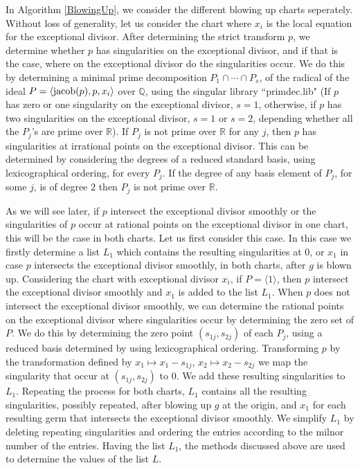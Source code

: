 \documentclass{amsproc}
\begin{document}
In Algorithm \ref{BlowingUp}, we consider the different blowing up charts seperately. Without loss of generality, let us consider the chart where $x_i$ is the local equation for the exceptional divisor. After determining the strict transform $p$, we determine whether $p$ has singularities on the exceptional divisor, and if that is the case, where on the exceptional divisor do the singularities occur. We do this by determining a minimal prime decomposition $P_1\cap\cdots\cap P_s$, of the radical of the ideal $P=\langle \textnormal{jacob}(p),p,x_i\rangle$ over $\mathbb Q$, using the singular library ``primdec.lib" \cite{primdec.lib} (If $p$ has zero or one singularity on the exceptional divisor, $s=1$, otherwise, if $p$ has two singularities on the exceptional divisor, $s=1$ or $s=2$, depending whether all the $P_j$'s are prime over $\mathbb R$).  If $P_j$ is not prime over $\mathbb R$ for any $j$, then $p$ has singularities at irrational points on the exceptional divisor. This can be determined by considering the degrees of a reduced standard basis, using lexicographical ordering, for every $P_j$. If the degree of any basis element of $P_j$, for some $j$, is of degree $2$ then $P_j$ is not prime over $\mathbb R$. 

As we will see later, if $p$ intersect the exceptional divisor smoothly or the singularities of $p$ occur at rational points on the exceptional divisor in one chart, this will be the case in both charts. Let us first consider this case. In this case we firstly determine a list $L_1$ which contains the resulting singularities at $0$, or $x_1$ in case $p$ intersects the exceptional divisor smoothly, in both charts, after $g$ is blown up. Considering the chart with exceptional divisor $x_i$, if $P=\langle 1\rangle$, then $p$ intersect the exceptional divisor smoothly and $x_1$ is added to the list $L_1$. When $p$ does not intersect the exceptional divisor smoothly, we can determine the rational points on the exceptional divisor where singularities occur by determining the zero set of $P$. We do this by determining the zero point $(s_{1j},s_{2j})$ of each $P_j$, using a reduced basis determined by using lexicographical ordering. Transforming $p$ by the transformation defined by $x_1\mapsto x_1-s_{1j}$, $x_2\mapsto x_2-s_{2j}$ we map the singularity that occur at  $(s_{1j},s_{2j})$ to $0$. We add these resulting singularities to $L_1$. Repeating the process for both charts, $L_1$ contains all the resulting singularities, possibly repeated, after blowing up $g$ at the origin, and $x_1$ for each resulting germ that intersects the exceptional divisor smoothly. We simplify $L_1$ by deleting repeating singularities and ordering the entries according to the milnor number of the entries. Having the list $L_1$, the methods discussed above are used to determine the values of the list $L$. 
\end{document}
